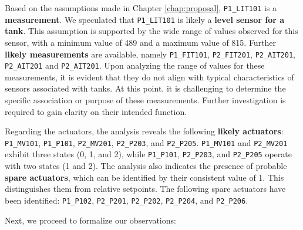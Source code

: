 Based on the assumptions made in Chapter \ref{chap:proposal}, \texttt{P1\_LIT101} is a \textbf{measurement}. We speculated that \texttt{P1\_LIT101} is likely a \textbf{level sensor for a tank}. This assumption is supported by the wide range of values observed for this sensor, with a minimum value of 489 and a maximum value of 815.
Further \textbf{likely measurements} are available, namely \texttt{P1\_FIT101}, \texttt{P2\_FIT201}, \texttt{P2\_AIT201}, \texttt{P2\_AIT201} and \texttt{P2\_AIT201}. Upon analyzing the range of values for these measurements, it is evident that they do not align with typical characteristics of sensors associated with tanks. At this point, it is challenging to determine the specific association or purpose of these measurements. Further investigation is required to gain clarity on their intended function.

\bigskip
Regarding the actuators, the analysis reveals the following \textbf{likely actuators}: \texttt{P1\_MV101}, \texttt{P1\_P101}, \texttt{P2\_MV201}, \texttt{P2\_P203}, and \texttt{P2\_P205}.\newline
\texttt{P1\_MV101} and \texttt{P2\_MV201} exhibit three states (0, 1, and 2), while \texttt{P1\_P101}, \texttt{P2\_P203}, and \texttt{P2\_P205} operate with two states (1 and 2).\newline
The analysis also indicates the presence of probable \textbf{spare actuators}, which can be identified by their consistent value of 1. This distinguishes them from relative setpoints.\newline 
The following spare actuators have been identified: \texttt{P1\_P102}, \texttt{P2\_P201}, \texttt{P2\_P202}, \texttt{P2\_P204}, and \texttt{P2\_P206}.

\noindent Next, we proceed to formalize our observations:

